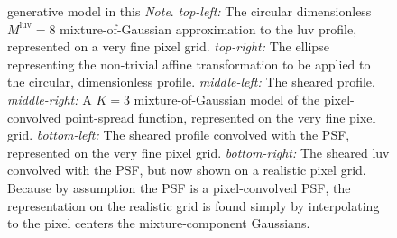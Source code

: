 \documentclass[12pt,pdftex,preprint]{aastex}
\newcommand{\documentname}{\textsl{Note}}
\newcommand{\luv}{\mathrm{luv}}
\begin{document}
\begin{figure}
{  generative model in this \documentname.  \textsl{top-left:} The
  circular dimensionless $M^{\luv}=8$ mixture-of-Gaussian
  approximation to the luv profile, represented on a very fine pixel
  grid. \textsl{top-right:} The ellipse representing the non-trivial
  affine transformation to be applied to the circular, dimensionless
  profile.  \textsl{middle-left:} The sheared profile.
  \textsl{middle-right:} A $K=3$ mixture-of-Gaussian model of the
  pixel-convolved point-spread function, represented on the very fine
  pixel grid.  \textsl{bottom-left:} The sheared profile convolved
  with the PSF, represented on the very fine pixel grid.
  \textsl{bottom-right:} The sheared luv convolved with the PSF, but
  now shown on a realistic pixel grid.  Because by assumption the PSF
  is a pixel-convolved PSF, the representation on the realistic grid
  is found simply by interpolating to the pixel centers the
  mixture-component Gaussians.\label{fig:example}}
\end{figure}
\end{document}
